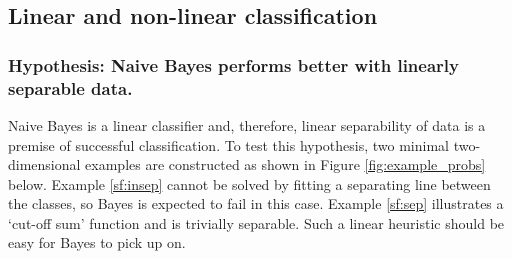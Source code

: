 \documentclass[12pt,a4paper,notitlepage,twoside]{scrbook}
\begin{document}
\subsection{Linear and non-linear classification}
\subsubsection*{Hypothesis: Naive Bayes performs better with linearly separable data.}

Naive Bayes is a linear classifier and, therefore, linear separability of data is a
premise of successful classification. To test this hypothesis, two minimal two-dimensional
examples are constructed as shown in Figure \ref{fig:example_probs} below.
Example \ref{sf:insep} cannot be solved by fitting a separating line between the
classes, so Bayes is expected to fail in this case. Example \ref{sf:sep} illustrates a
`cut-off sum' function and is trivially separable. Such a linear heuristic should be easy
for Bayes to pick up on.
\end{document}
